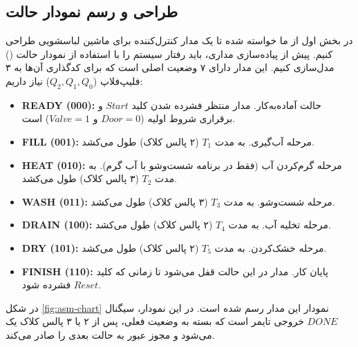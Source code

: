 \documentclass[12pt]{article}
\begin{document}
	\subsection{طراحی و رسم نمودار حالت }
	در بخش اول از ما خواسته شده تا یک مدار کنترل‌کننده برای ماشین لباسشویی طراحی کنیم. پیش از پیاده‌سازی مداری، باید رفتار سیستم را با استفاده از نمودار حالت () مدل‌سازی کنیم. این مدار دارای ۷ وضعیت اصلی است که برای کدگذاری آن‌ها به ۳ فلیپ‌فلاپ ($Q_2, Q_1, Q_0$) نیاز داریم:
	
	\begin{itemize}
		\item \textbf{READY (000):} حالت آماده‌به‌کار. مدار منتظر فشرده شدن کلید $Start$ و برقراری شروط اولیه ($Door=0$ و $Valve=1$) است.
		\item \textbf{FILL (001):} مرحله آب‌گیری. به مدت $T_1$ (۲ پالس کلاک) طول می‌کشد.
		\item \textbf{HEAT (010):} مرحله گرم‌کردن آب (فقط در برنامه شست‌وشو با آب گرم). به مدت $T_2$ (۳ پالس کلاک) طول می‌کشد.
		\item \textbf{WASH (011):} مرحله شست‌وشو. به مدت $T_3$ (۳ پالس کلاک) طول می‌کشد.
		\item \textbf{DRAIN (100):} مرحله تخلیه آب. به مدت $T_4$ (۲ پالس کلاک) طول می‌کشد.
		\item \textbf{DRY (101):} مرحله خشک‌کردن. به مدت $T_5$ (۲ پالس کلاک) طول می‌کشد.
		\item \textbf{FINISH (110):} پایان کار. مدار در این حالت قفل می‌شود تا زمانی که کلید $Reset$ فشرده شود.
	\end{itemize}
	
	در شکل \ref{fig:asm-chart} نمودار  این مدار رسم شده است. در این نمودار، سیگنال $DONE$ خروجی تایمر است که بسته به وضعیت فعلی، پس از ۲ یا ۳ پالس کلاک یک می‌شود و مجوز عبور به حالت بعدی را صادر می‌کند.
	
\end{document}

